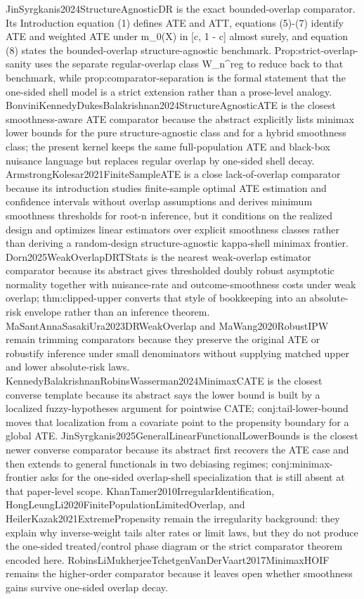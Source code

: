 \documentclass{article}
\begin{document}
JinSyrgkanis2024StructureAgnosticDR is the exact bounded-overlap comparator. Its Introduction equation (1) defines ATE and ATT, equations (5)-(7) identify ATE and weighted ATE under m_0(X) in [c, 1 - c] almost surely, and equation (8) states the bounded-overlap structure-agnostic benchmark. Prop:strict-overlap-sanity uses the separate regular-overlap class W_n^reg to reduce back to that benchmark, while prop:comparator-separation is the formal statement that the one-sided shell model is a strict extension rather than a prose-level analogy. BonviniKennedyDukesBalakrishnan2024StructureAgnosticATE is the closest smoothness-aware ATE comparator because the abstract explicitly lists minimax lower bounds for the pure structure-agnostic class and for a hybrid smoothness class; the present kernel keeps the same full-population ATE and black-box nuisance language but replaces regular overlap by one-sided shell decay. ArmstrongKolesar2021FiniteSampleATE is a close lack-of-overlap comparator because its introduction studies finite-sample optimal ATE estimation and confidence intervals without overlap assumptions and derives minimum smoothness thresholds for root-n inference, but it conditions on the realized design and optimizes linear estimators over explicit smoothness classes rather than deriving a random-design structure-agnostic kappa-shell minimax frontier. Dorn2025WeakOverlapDRTStats is the nearest weak-overlap estimator comparator because its abstract gives thresholded doubly robust asymptotic normality together with nuisance-rate and outcome-smoothness costs under weak overlap; thm:clipped-upper converts that style of bookkeeping into an absolute-risk envelope rather than an inference theorem. MaSantAnnaSasakiUra2023DRWeakOverlap and MaWang2020RobustIPW remain trimming comparators because they preserve the original ATE or robustify inference under small denominators without supplying matched upper and lower absolute-risk laws. KennedyBalakrishnanRobinsWasserman2024MinimaxCATE is the closest converse template because its abstract says the lower bound is built by a localized fuzzy-hypotheses argument for pointwise CATE; conj:tail-lower-bound moves that localization from a covariate point to the propensity boundary for a global ATE. JinSyrgkanis2025GeneralLinearFunctionalLowerBounds is the closest newer converse comparator because its abstract first recovers the ATE case and then extends to general functionals in two debiasing regimes; conj:minimax-frontier asks for the one-sided overlap-shell specialization that is still absent at that paper-level scope. KhanTamer2010IrregularIdentification, HongLeungLi2020FinitePopulationLimitedOverlap, and HeilerKazak2021ExtremePropensity remain the irregularity background: they explain why inverse-weight tails alter rates or limit laws, but they do not produce the one-sided treated/control phase diagram or the strict comparator theorem encoded here. RobinsLiMukherjeeTchetgenVanDerVaart2017MinimaxHOIF remains the higher-order comparator because it leaves open whether smoothness gains survive one-sided overlap decay.
\end{document}
